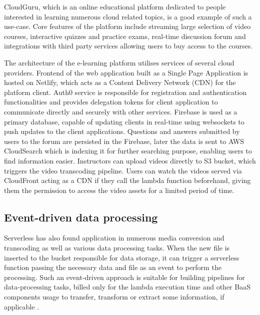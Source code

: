 CloudGuru, which is an online educational platform dedicated to people interested in learning numerous cloud related topics, is a good example of such a use-case. Core features of the platform include streaming large selection of video courses, interactive quizzes and practice exams, real-time discussion forum and integrations with third party services allowing users to buy access to the courses.

The architecture of the e-learning platform utilises services of several cloud providers. Frontend of the web application built as a Single Page Application is hosted on Netlify, which acts as a Content Delivery Network (CDN) for the platform client. Auth0 service is responsible for registration and authentication functionalities and provides delegation tokens for client application to communicate directly and securely with other services. Firebase is used as a primary database, capable of updating clients in real-time using websockets to push updates to the client applications. Questions and answers submitted by users to the forum are persisted in the Firebase, later the data is sent to AWS CloudSearch which is indexing it for further searching purpose, enabling users to find information easier. Instructors can upload videos directly to S3 bucket, which triggers the video transcoding pipeline. Users can watch the videos served via CloudFront acting as a CDN if they call the lambda function beforehand, giving them the permission to access the video assets for a limited period of time.

\subsection{Event-driven data processing}


Serverless has also found application in numerous media conversion and transcoding as well as various data processing tasks. When the new file is inserted to the bucket responsible for data storage, it can trigger a serverless function passing the necessary data and file as an event to perform the processing. Such an event-driven approach is suitable for building pipelines for data-processing tasks, billed only for the lambda execution time and other BaaS components usage to transfer, transform or extract some information, if applicable \cite{ServerlessArchitectureOnAWS}.


